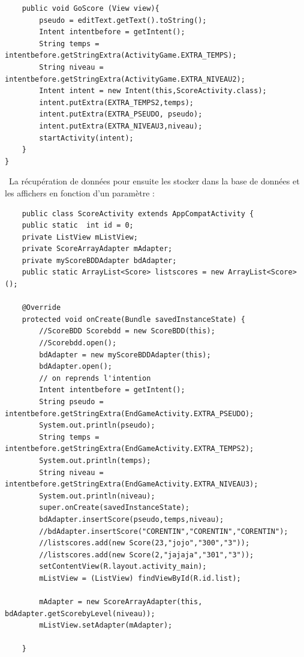 \documentclass{article}
\begin{document}
\begin{itemize}
\begin{verbatim}
    public void GoScore (View view){
        pseudo = editText.getText().toString();
        Intent intentbefore = getIntent();
        String temps = intentbefore.getStringExtra(ActivityGame.EXTRA_TEMPS);
        String niveau = intentbefore.getStringExtra(ActivityGame.EXTRA_NIVEAU2);
        Intent intent = new Intent(this,ScoreActivity.class);
        intent.putExtra(EXTRA_TEMPS2,temps);
        intent.putExtra(EXTRA_PSEUDO, pseudo);
        intent.putExtra(EXTRA_NIVEAU3,niveau);
        startActivity(intent);
    }
}
\end{verbatim}
\ La récupération de données pour ensuite les stocker dans la base de données et les affichers en fonction d'un paramètre :
\begin{verbatim}
    public class ScoreActivity extends AppCompatActivity {
    public static  int id = 0;
    private ListView mListView;
    private ScoreArrayAdapter mAdapter;
    private myScoreBDDAdapter bdAdapter;
    public static ArrayList<Score> listscores = new ArrayList<Score>();

    @Override
    protected void onCreate(Bundle savedInstanceState) {
        //ScoreBDD Scorebdd = new ScoreBDD(this);
        //Scorebdd.open();
        bdAdapter = new myScoreBDDAdapter(this);
        bdAdapter.open();
        // on reprends l'intention
        Intent intentbefore = getIntent();
        String pseudo = intentbefore.getStringExtra(EndGameActivity.EXTRA_PSEUDO);
        System.out.println(pseudo);
        String temps = intentbefore.getStringExtra(EndGameActivity.EXTRA_TEMPS2);
        System.out.println(temps);
        String niveau = intentbefore.getStringExtra(EndGameActivity.EXTRA_NIVEAU3);
        System.out.println(niveau);
        super.onCreate(savedInstanceState);
        bdAdapter.insertScore(pseudo,temps,niveau);
        //bdAdapter.insertScore("CORENTIN","CORENTIN","CORENTIN");
        //listscores.add(new Score(23,"jojo","300","3"));
        //listscores.add(new Score(2,"jajaja","301","3"));
        setContentView(R.layout.activity_main);
        mListView = (ListView) findViewById(R.id.list);

        mAdapter = new ScoreArrayAdapter(this, bdAdapter.getScorebyLevel(niveau));
        mListView.setAdapter(mAdapter);

    }
\end{verbatim}
\end{itemize}
\end{document}
